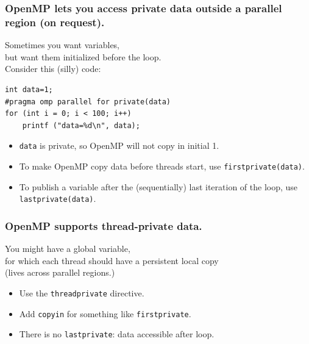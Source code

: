 \begin{frame}[fragile]
  \frametitle{OpenMP lets you access private data outside a parallel region (on request).}

\begin{changemargin}{1.5cm}
\large
Sometimes you want  variables,\\
but want them initialized
before the loop.\\[1em]

Consider this (silly) code:

\begin{lstlisting}
int data=1;
#pragma omp parallel for private(data)
for (int i = 0; i < 100; i++)
    printf ("data=%d\n", data);
\end{lstlisting}


\begin{itemize}
  \item {\tt data} is private, so OpenMP will not copy in initial 1.
  \item To make OpenMP copy data before threads start, use
    {\tt firstprivate(data)}.
  \item To publish a variable after the (sequentially) last iteration of the loop, use
    {\tt lastprivate(data)}.
\end{itemize}
  
\end{changemargin}
\end{frame}

\begin{frame}
  \frametitle{OpenMP supports thread-private data.}

\begin{changemargin}{1cm}
\large
    You might have a global variable, \\
for which each thread should have a persistent local copy\\
\hspace*{3em} (lives across parallel regions.)\\[1em]
  \begin{itemize}
    \item Use the {\tt threadprivate} directive.
    \item Add {\tt copyin} for something like
      {\tt firstprivate}.
    \item There is no {\tt lastprivate}: data accessible after 
      loop.
  \end{itemize}
\end{changemargin}

\end{frame}

